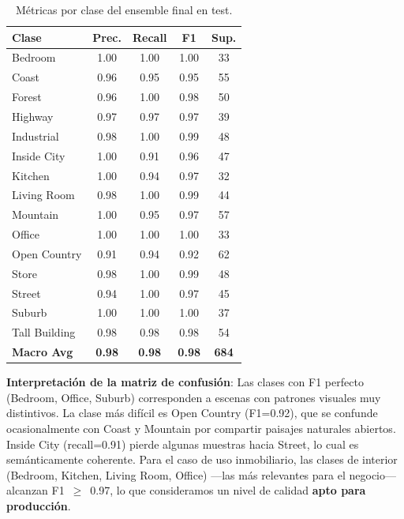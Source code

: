 \documentclass[10pt,a4paper,twocolumn]{article}
\begin{document}
\begin{table}[H]
\centering
\caption{Métricas por clase del ensemble final en test.}
\label{tab:perclass}
\small
\setlength{\tabcolsep}{3pt}
\begin{tabular}{lcccc}
\toprule
\textbf{Clase} & \textbf{Prec.} & \textbf{Recall} & \textbf{F1} & \textbf{Sup.} \\
\midrule
Bedroom        & 1.00 & 1.00 & 1.00 & 33 \\
Coast          & 0.96 & 0.95 & 0.95 & 55 \\
Forest         & 0.96 & 1.00 & 0.98 & 50 \\
Highway        & 0.97 & 0.97 & 0.97 & 39 \\
Industrial     & 0.98 & 1.00 & 0.99 & 48 \\
Inside City    & 1.00 & 0.91 & 0.96 & 47 \\
Kitchen        & 1.00 & 0.94 & 0.97 & 32 \\
Living Room    & 0.98 & 1.00 & 0.99 & 44 \\
Mountain       & 1.00 & 0.95 & 0.97 & 57 \\
Office         & 1.00 & 1.00 & 1.00 & 33 \\
Open Country   & 0.91 & 0.94 & 0.92 & 62 \\
Store          & 0.98 & 1.00 & 0.99 & 48 \\
Street         & 0.94 & 1.00 & 0.97 & 45 \\
Suburb         & 1.00 & 1.00 & 1.00 & 37 \\
Tall Building  & 0.98 & 0.98 & 0.98 & 54 \\
\midrule
\textbf{Macro Avg} & \textbf{0.98} & \textbf{0.98} & \textbf{0.98} & \textbf{684} \\
\bottomrule
\end{tabular}
\end{table}

\textbf{Interpretación de la matriz de confusión}: Las clases con F1 perfecto (Bedroom, Office, Suburb) corresponden a escenas con patrones visuales muy distintivos. La clase más difícil es Open Country (F1=0.92), que se confunde ocasionalmente con Coast y Mountain por compartir paisajes naturales abiertos. Inside City (recall=0.91) pierde algunas muestras hacia Street, lo cual es semánticamente coherente. Para el caso de uso inmobiliario, las clases de interior (Bedroom, Kitchen, Living Room, Office) ---las más relevantes para el negocio--- alcanzan F1~$\geq$~0.97, lo que consideramos un nivel de calidad \textbf{apto para producción}.
\end{document}
